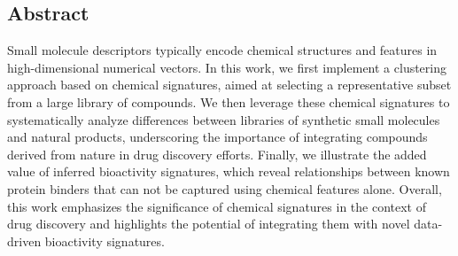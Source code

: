 \subsection{Abstract}

Small molecule descriptors typically encode chemical structures and features in high-dimensional numerical vectors. In this work, we first implement a clustering approach based on chemical signatures, aimed at selecting a representative subset from a large library of compounds. We then leverage these chemical signatures to systematically analyze differences between libraries of synthetic small molecules and natural products, underscoring the importance of integrating compounds derived from nature in drug discovery efforts. Finally, we illustrate the added value of inferred bioactivity signatures, which reveal relationships between known protein binders that can not be captured using chemical features alone. Overall, this work emphasizes the significance of chemical signatures in the context of drug discovery and highlights the potential of integrating them with novel data-driven bioactivity signatures. 
